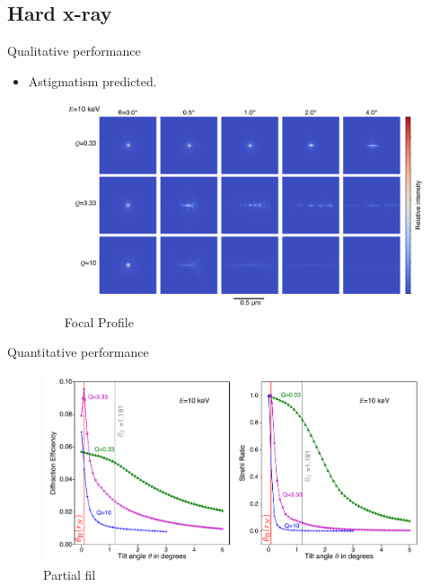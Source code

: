 \documentclass{beamer}
\begin{document}
\subsection{Hard x-ray}
\begin{frame}{Qualitative performance}
	\begin{itemize}
		\item Astigmatism predicted.
		\begin{center}
			\begin{figure}
				\includegraphics[scale=0.29]{foc_spot_ten}
				\caption{Focal Profile}	
			\end{figure}
		\end{center}
	\end{itemize}
\end{frame}


\begin{frame}{Quantitative performance}
		\begin{center}
			\begin{figure}
				\includegraphics[scale=0.4]{tilt_plot_ten}
				\caption{Partial fil}	
			\end{figure}
		\end{center}
\end{frame}
\end{document}
